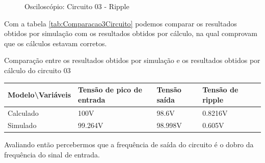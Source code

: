 \begin{figure}[H]
    \centering
    \caption{Osciloscópio: Circuito 03 - Ripple}
    \vspace{-0.3cm}
    \label{fig:OsciloscopioCircuito03Ripple}
\end{figure}

Com a tabela \ref{tab:Comparacao3Circuito} podemos comparar os resultados obtidos por simulação com os resultados obtidos por cálculo, na qual comprovam que os cálculos estavam corretos.

\begin{quadro}[H]
    \centering
    \caption{Comparação entre os resultados obtidos por simulação e os resultados obtidos por cálculo do circuito 03}
    \begin{tabular}{|C{0.19\textwidth}|C{0.24\textwidth}|C{0.24\textwidth}|C{0.24\textwidth}|C{0.24\textwidth}|}
        \hline
        \textbf{Modelo\textbackslash{}Variáveis} & \textbf{Tensão de pico de entrada} & \textbf{Tensão saída} & \textbf{Tensão de ripple}\\
        \hline
        Calculado & 100V & 98.6V & 0.8216V \\
        \hline
        Simulado & 99.264V & 98.998V & 0.605V \\
        \hline
    \end{tabular}
    \vspace{-0.6cm}
    \label{tab:Comparacao3Circuito}
\end{quadro}

Avaliando então percebermos que a frequência de saída do circuito é o dobro da frequência do sinal de entrada.